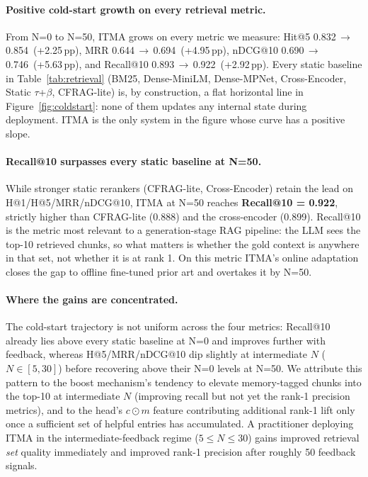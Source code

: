 \documentclass[preprint,12pt]{elsarticle}
\begin{document}
\paragraph{Positive cold-start growth on every retrieval metric.}
From N=0 to N=50, ITMA grows on every metric we measure: Hit@5
0.832\,$\rightarrow$\,0.854~(+2.25\,pp), MRR
0.644\,$\rightarrow$\,0.694~(+4.95\,pp), nDCG@10
0.690\,$\rightarrow$\,0.746~(+5.63\,pp), and Recall@10
0.893\,$\rightarrow$\,0.922~(+2.92\,pp).  Every static baseline in
Table~\ref{tab:retrieval} (BM25, Dense-MiniLM, Dense-MPNet, Cross-Encoder,
Static $\tau$+$\beta$, CFRAG-lite) is, by construction, a flat horizontal
line in Figure~\ref{fig:coldstart}: none of them updates any internal state
during deployment.  ITMA is the only system in the figure whose curve has a
positive slope.

\paragraph{Recall@10 surpasses every static baseline at N=50.}
While stronger static rerankers (CFRAG-lite, Cross-Encoder) retain the lead
on H@1/H@5/MRR/nDCG@10, ITMA at N=50 reaches \textbf{Recall@10 = 0.922},
strictly higher than CFRAG-lite (0.888) and the cross-encoder (0.899).
Recall@10 is the metric most relevant to a generation-stage RAG pipeline:
the LLM sees the top-10 retrieved chunks, so what matters is whether the
gold context is anywhere in that set, not whether it is at rank 1.  On this
metric ITMA's online adaptation closes the gap to offline fine-tuned prior
art and overtakes it by N=50.

\paragraph{Where the gains are concentrated.}
The cold-start trajectory is not uniform across the four metrics: Recall@10
already lies above every static baseline at N=0 and improves further with
feedback, whereas H@5/MRR/nDCG@10 dip slightly at intermediate $N$
($N{\in}[5,30]$) before recovering above their N=0 levels at N=50.  We
attribute this pattern to the boost mechanism's tendency to elevate
memory-tagged chunks into the top-10 at intermediate $N$ (improving recall
but not yet the rank-1 precision metrics), and to the head's $c{\odot}m$
feature contributing additional rank-1 lift only once a sufficient set of
helpful entries has accumulated.  A practitioner deploying ITMA in the
intermediate-feedback regime ($5\!\le\!N\!\le\!30$) gains improved retrieval
\emph{set} quality immediately and improved rank-1 precision after roughly
50 feedback signals.
\end{document}
